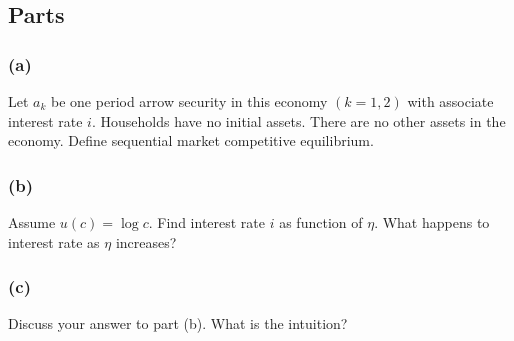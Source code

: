 \documentclass[10pt, a4paper]{article}
\begin{document}
  \subsection*{Parts}
    \subsubsection*{(a)}
      Let $a_k$ be one period arrow security in this economy $(k = 1,2)$ with associate interest rate $i$. Households have no initial assets. There are no other assets in the economy. Define sequential market competitive equilibrium.
    \subsubsection*{(b)}
      Assume $u(c) = \log c$. Find interest rate $i$ as function of $\eta$. What happens to interest rate as $\eta$ increases?
    \subsubsection*{(c)}
      Discuss your answer to part (b). What is the intuition?
\end{document}
